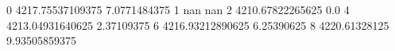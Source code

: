 0 4217.75537109375 7.0771484375
1 nan nan
2 4210.67822265625 0.0
4 4213.04931640625 2.37109375
6 4216.93212890625 6.25390625
8 4220.61328125 9.93505859375
